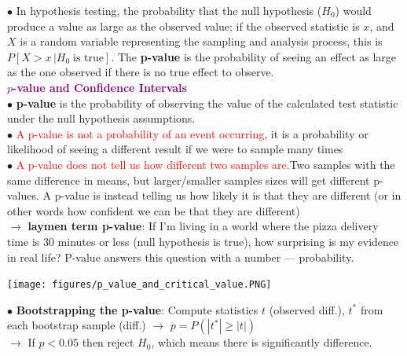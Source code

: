 \documentclass[letterpaper, 10.5pt,landscape]{article}
\begin{document}
\begin{multicols*}{3}
\vspace{2pt}


$\bullet$ In hypothesis testing, the probability that the null hypothesis ($H_{0}$) would produce a value as large as the observed value; if the observed statistic is $x$, and $X$ is a random variable representing the sampling and analysis process, this is $\boxed{P[X>x \, | H_{0} \; \text{is true}]}$.  The  \textbf{p-value} is the probability of seeing an effect as large as the one observed if there is no true effect to observe.  \\


\vspace{3pt}
\textcolor{purple}{\textbf{\textbf{$p$-value and Confidence Intervals}}} \\
$\bullet$ \textbf{p-value} is the probability of observing the value of the calculated test statistic under the null hypothesis assumptions. \\

$\bullet$ \textcolor{red}{A p-value is not a probability of an event occurring}, it is a
probability or likelihood of seeing a different result if we were to sample
many times \\

$\bullet$ \textcolor{red}{A p-value does not tell us how different two samples are.}Two
samples with the same difference in means, but larger/smaller samples
sizes will get different p-values. A p-value is instead telling us how likely
it is that they are different (or in other words how confident we can be
that they are different) \\

$\rightarrow$ \textbf{laymen term p-value}: If I’m living in a world where the pizza delivery time is 30 minutes or less (null hypothesis is true), how surprising is my evidence in real life? P-value answers this question with a number — probability.


\begin{center}
    \begin{minipage}{\linewidth}
    \texttt{[image: figures/p\_value\_and\_critical\_value.PNG]}
    \end{minipage}
\end{center}


\vspace{2pt}
$\bullet$ \textbf{Bootstrapping the p-value}: Compute statistics \textbf{$t$} (observed diff.), $t^{*}$ from each bootstrap sample (diff.) $\rightarrow$ $\boxed{p = P(|t^{*}| \geq |t|)}$  \\ $\rightarrow$ If $p < 0.05$ then reject $H_{0}$, which means there is significantly difference.\\



\end{multicols*}
\end{document}
